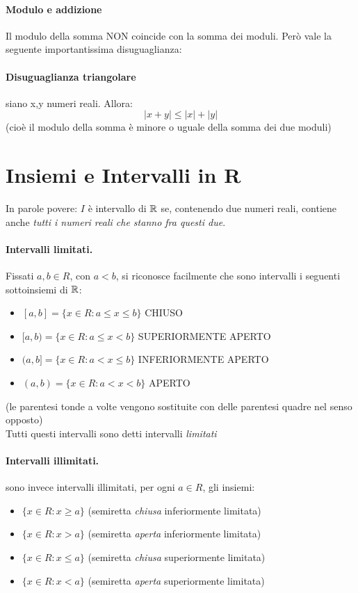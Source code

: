 \documentclass[12pt, a4paper, openany]{book}
\begin{document}
\paragraph{Modulo e addizione}
Il modulo della somma NON coincide con la somma dei moduli. Però vale la seguente importantissima disuguaglianza:
\paragraph{Disuguaglianza triangolare} siano x,y numeri reali. Allora:
\begin{equation}
	|x+y| \leq |x| + |y|
\end{equation}
(cioè il modulo della somma è minore o uguale della somma dei due moduli)

\section{Insiemi e Intervalli in R}

In parole povere: $I$ è intervallo di $\mathbb{R}$ se, contenendo due numeri reali, contiene anche \emph{tutti i numeri reali che stanno fra questi due}.

\paragraph{Intervalli limitati.}
Fissati $a, b \in R$, con $a<b$, si riconosce facilmente che sono intervalli i seguenti sottoinsiemi di $\mathbb{R}$:
\begin{itemize}
	\item[] $[a,b] = \{x \in R : a \leq x \leq b\}$ CHIUSO
	\item[] $[a,b) = \{x \in R : a \leq x < b\}$ SUPERIORMENTE APERTO
	\item[] $(a,b] = \{x \in R : a < x \leq b\}$ INFERIORMENTE APERTO
	\item[] $(a,b) = \{x \in R : a < x < b\}$ APERTO
\end{itemize}
{\tiny(le parentesi tonde a volte vengono sostituite con delle parentesi quadre nel senso opposto)}
\\Tutti questi intervalli sono detti intervalli \emph{limitati}
\paragraph{Intervalli illimitati.} sono invece intervalli illimitati, per ogni $a \in R$, gli insiemi:
\begin{itemize}
	\item[] $\{x \in R: x \geq a\}$ (semiretta \emph{chiusa} inferiormente limitata)
	\item[] $\{x \in R: x > a\}$ (semiretta \emph{aperta} inferiormente limitata)
	\item[] $\{x \in R: x \leq a\}$ (semiretta \emph{chiusa} superiormente limitata)
	\item[] $\{x \in R: x < a\}$ (semiretta \emph{aperta} superiormente limitata)
\end{itemize}
\end{document}

